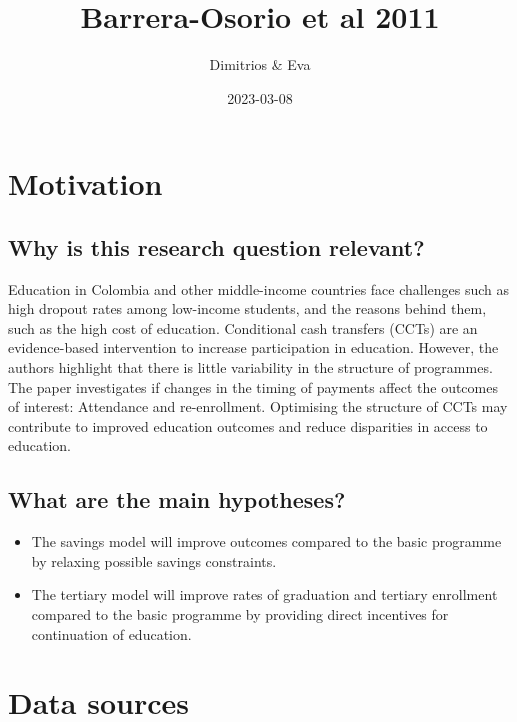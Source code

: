 \documentclass[
]{article}
\title{Barrera-Osorio et al 2011}
\author{Dimitrios \& Eva}
\date{2023-03-08}
\providecommand{\tightlist}{%
  \setlength{\itemsep}{0pt}\setlength{\parskip}{0pt}}
\begin{document}
\maketitle

{
\setcounter{tocdepth}{1}
\tableofcontents
}
\newpage

\hypertarget{motivation}{%
\section{Motivation}\label{motivation}}

\hypertarget{why-is-this-research-question-relevant}{%
\subsection{Why is this research question
relevant?}\label{why-is-this-research-question-relevant}}

Education in Colombia and other middle-income countries face challenges
such as high dropout rates among low-income students, and the reasons
behind them, such as the high cost of education. Conditional cash
transfers (CCTs) are an evidence-based intervention to increase
participation in education. However, the authors highlight that there is
little variability in the structure of programmes. The paper
investigates if changes in the timing of payments affect the outcomes of
interest: Attendance and re-enrollment. Optimising the structure of CCTs
may contribute to improved education outcomes and reduce disparities in
access to education.

\hypertarget{what-are-the-main-hypotheses}{%
\subsection{What are the main
hypotheses?}\label{what-are-the-main-hypotheses}}

\begin{itemize}
\tightlist
\item
  The savings model will improve outcomes compared to the basic
  programme by relaxing possible savings constraints.
\item
  The tertiary model will improve rates of graduation and tertiary
  enrollment compared to the basic programme by providing direct
  incentives for continuation of education.
\end{itemize}

\hypertarget{data-sources}{%
\section{Data sources}\label{data-sources}}
\end{document}
